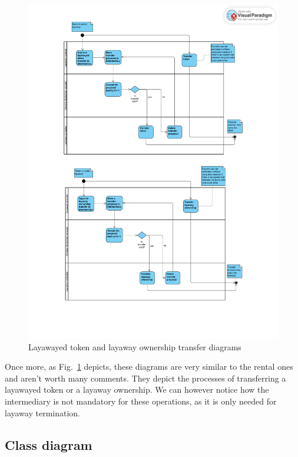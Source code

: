 \documentclass[english, LaM, oneside]{sapthesis}%
\begin{document}
\begin{figure}[H]
    \centering
        \begin{adjustbox}{width=1\textwidth}
            \includegraphics{ActivityDiagrams/activity_layawayTransfer.pdf} 
        \end{adjustbox}
    \caption{Layawayed token and layaway ownership transfer diagrams}
    \label{fig:LayawayTransfer AD}
\end{figure}

Once more, as Fig.~\ref{fig:LayawayTransfer AD} depicts, these diagrams are very similar to the rental ones and aren't worth many comments. They depict the processes of transferring a layawayed token or a layaway ownership. We can however notice how the intermediary is not mandatory for these operations, as it is only needed for layaway termination.


\subsection{Class diagram}
\end{document}
